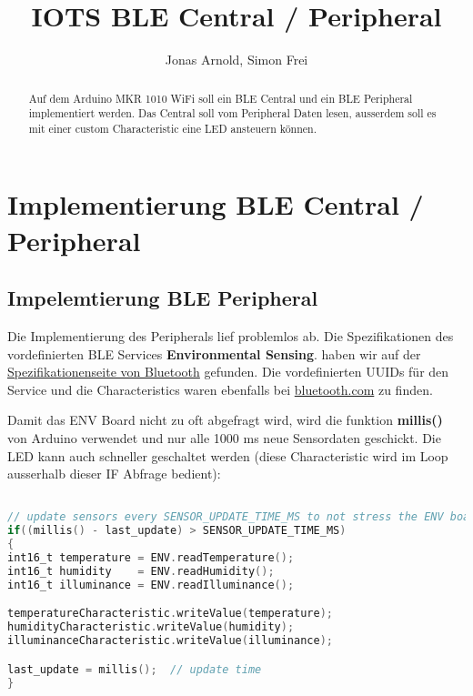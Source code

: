 \documentclass{article}
\title{IOTS BLE Central / Peripheral}
\author{Jonas Arnold, Simon Frei}
\begin{document}
\maketitle

\begin{abstract}
Auf dem Arduino MKR 1010 WiFi soll ein BLE Central und ein BLE Peripheral implementiert werden. Das Central soll vom Peripheral Daten lesen, ausserdem soll es mit einer custom Characteristic eine LED ansteuern können. 
\end{abstract}

\section{Implementierung BLE Central / Peripheral}

\subsection{Impelemtierung BLE Peripheral }

Die Implementierung des Peripherals lief problemlos ab. Die Spezifikationen des vordefinierten BLE Services \textbf{Environmental Sensing}. haben wir auf der \href{https://www.bluetooth.com/specifications/specs/}{Spezifikationenseite von Bluetooth} gefunden. Die vordefinierten UUIDs für den Service und die Characteristics waren ebenfalls bei \href{ bluetooth.com/specifications/assigned-numbers }{bluetooth.com} zu finden. 

Damit das ENV Board nicht zu oft abgefragt wird, wird die funktion \textbf{millis()} von Arduino verwendet und nur alle 1000 ms neue Sensordaten geschickt. Die LED kann auch schneller geschaltet werden (diese Characteristic wird im Loop ausserhalb dieser IF Abfrage bedient):
\begin{lstlisting}[style=CStyle, language=C, caption=Limitierung der Sensordatenabfragen]  % Start your code-block

// update sensors every SENSOR_UPDATE_TIME_MS to not stress the ENV board
if((millis() - last_update) > SENSOR_UPDATE_TIME_MS)
{
int16_t temperature = ENV.readTemperature();
int16_t humidity    = ENV.readHumidity();
int16_t illuminance = ENV.readIlluminance();

temperatureCharacteristic.writeValue(temperature);
humidityCharacteristic.writeValue(humidity);
illuminanceCharacteristic.writeValue(illuminance);

last_update = millis();  // update time
}

\end{lstlisting}
\end{document}
